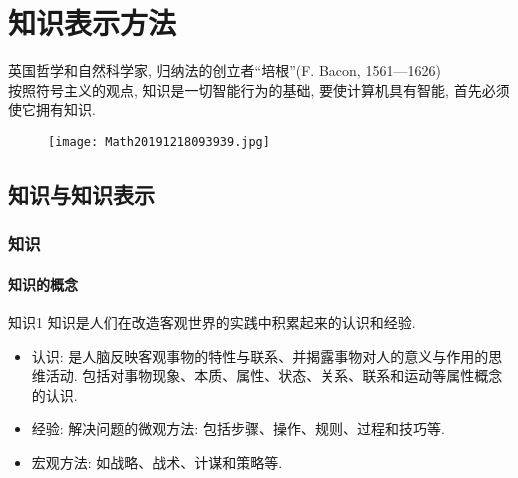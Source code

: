 \chapter{知识表示方法}\label{AIchap2}
\begin{tcolorbox}[colback=white!50,colframe=orange!50,title=知 识 就 是 力 量]
   英国哲学和自然科学家, 归纳法的创立者“培根”(F. Bacon, 1561—1626)\hfill\\
   按照符号主义的观点, 知识是一切智能行为的基础, 要使计算机具有智能, 首先必须使它拥有知识.
\end{tcolorbox}
\begin{figure}[H]
\centering
\texttt{[image: Math20191218093939.jpg]}
\label{Math20191218093939}
\end{figure}
\newpage
\section{知识与知识表示}
\subsection{知识}
\subsubsection{知识的概念}
\begin{mydef}{知识}{1}
知识是人们在改造客观世界的实践中积累起来的认识和经验.
\end{mydef}
\begin{itemize}
\item  认识: 是人脑反映客观事物的特性与联系、并揭露事物对人的意义与作用的思维活动. 包括对事物现象、本质、属性、状态、关系、联系和运动等属性概念的认识.
\item  经验: 解决问题的微观方法: 包括步骤、操作、规则、过程和技巧等.
\item  宏观方法: 如战略、战术、计谋和策略等.
\end{itemize}
